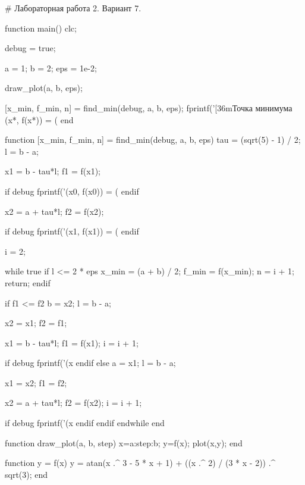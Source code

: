 # Лабораторная работа 2. Вариант 7.

function main()
  clc;

  debug = true;

  a = 1;
  b = 2;
  eps = 1e-2;

  draw_plot(a, b, eps);

  [x_min, f_min, n] = find_min(debug, a, b, eps);
  fprintf('\n{}[36mТочка минимума (x*, f(x*)) = (%
end

function [x_min, f_min, n] = find_min(debug, a, b, eps)
  tau = (sqrt(5) - 1) / 2;
  l = b - a;

  x1 = b - tau*l;
  f1 = f(x1);

  if debug
    fprintf('(x0, f(x0)) = (%
  endif

  x2 = a + tau*l;
  f2 = f(x2);

  if debug
    fprintf('(x1, f(x1)) = (%
  endif

  i = 2;

  while true
    if l <= 2 * eps
      x_min = (a + b) / 2;
      f_min = f(x_min);
      n = i + 1;
      return;
    endif

    if f1 <= f2
      b = x2;
      l = b - a;

      x2 = x1;
      f2 = f1;

      x1 = b - tau*l;
      f1 = f(x1);
      i = i + 1;

      if debug
        fprintf('(x%
      endif
    else
      a = x1;
      l = b - a;

      x1 = x2;
      f1 = f2;

      x2 = a + tau*l;
      f2 = f(x2);
      i = i + 1;

      if debug
        fprintf('(x%
      endif
    endif
  endwhile
end

function draw_plot(a, b, step)
  x=a:step:b;
  y=f(x);
  plot(x,y);
end

function y = f(x)
  y = atan(x .^ 3 - 5 * x + 1) + ((x .^ 2) / (3 * x - 2)) .^ sqrt(3);
end



